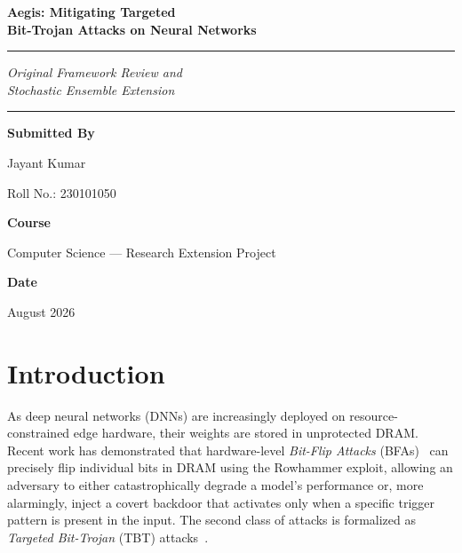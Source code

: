 \documentclass[12pt,a4paper]{article}
\newcommand{\tbt}{\textsc{TBT}}
\begin{document}
\begin{titlepage}
    \centering
    \vspace*{1.5cm}
    {\Huge\bfseries\color{darkblue} Aegis: Mitigating Targeted\\[0.4em]
    Bit-Trojan Attacks on Neural Networks\par}
    \vspace{0.5cm}
    \rule{\linewidth}{2pt}
    \vspace{0.3cm}
    {\Large\itshape Original Framework Review and\\[0.2em]
    Stochastic Ensemble Extension\par}
    \vspace{1cm}
    \rule{\linewidth}{0.5pt}
    \vspace{1cm}
    {\large\bfseries Submitted By\par}
    \vspace{0.3cm}
    {\large Jayant Kumar\par}
    {\large Roll No.: 230101050\par}
    \vspace{1cm}
    {\large\bfseries Course\par}
    \vspace{0.3cm}
    {\large Computer Science --- Research Extension Project\par}
    \vspace{1cm}
    {\large\bfseries Date\par}
    \vspace{0.3cm}
    {\large August 2026\par}
    \vspace{2cm}
\end{titlepage}

\tableofcontents
\newpage

\section{Introduction}
\label{sec:intro}

As deep neural networks (DNNs) are increasingly deployed on resource-constrained edge hardware, their weights are stored in unprotected DRAM. Recent work has demonstrated that hardware-level \textit{Bit-Flip Attacks} (BFAs)~\cite{bfa2019} can precisely flip individual bits in DRAM using the Rowhammer exploit, allowing an adversary to either catastrophically degrade a model's performance or, more alarmingly, inject a covert backdoor that activates only when a specific trigger pattern is present in the input. The second class of attacks is formalized as \textit{Targeted Bit-Trojan} (\tbt{}) attacks~\cite{tbt2020}.
\end{document}
